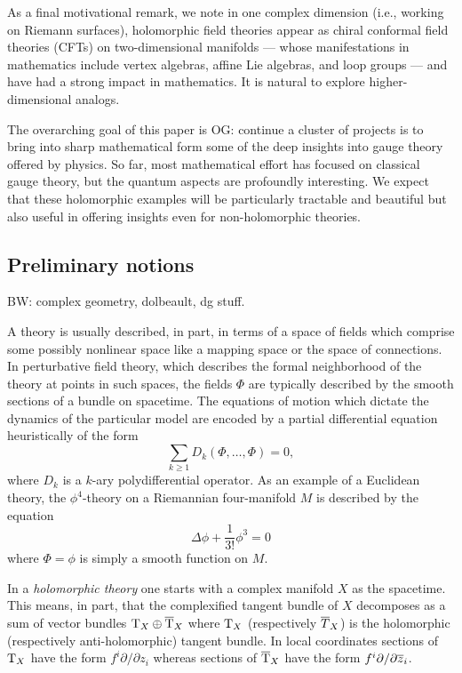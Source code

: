 \documentclass[11pt]{amsart}
\def\del{\partial}
\def\brian#1{{\textcolor{blue!65!red}{BW: {#1}}}}
\def\owen#1{{\textcolor{violet!65!black}{OG: {#1}}}}
\begin{document}
As a final motivational remark, we note in one complex dimension (i.e., working on Riemann surfaces), holomorphic field theories appear as chiral conformal field theories (CFTs) on two-dimensional manifolds --- whose manifestations in mathematics include vertex algebras, affine Lie algebras, and loop groups --- and have had a strong impact in mathematics.
It is natural to explore higher-dimensional analogs.

The overarching goal of this paper is \owen{continue}
a cluster of projects is to bring into sharp mathematical form some of the deep insights into gauge theory offered by physics.
So far, most mathematical effort has focused on classical gauge theory,
but the quantum aspects are profoundly interesting.
We expect that these holomorphic examples will be particularly tractable and beautiful but also useful in offering insights even for non-holomorphic theories.

\subsection{Preliminary notions}


\brian{complex geometry, dolbeault, dg stuff.}

A theory is usually described, in part, in terms of a space of fields which comprise some possibly nonlinear space like a mapping space or the space of connections. 
In perturbative field theory, which describes the formal neighborhood of the theory at points in such spaces, the fields $\Phi$ are typically described by the smooth sections of a bundle on spacetime.
The equations of motion which dictate the dynamics of the particular model are encoded by a partial differential equation heuristically of the form 
\[
\sum_{k \geq 1} D_k(\Phi,\ldots,\Phi) = 0 ,
\]
where $D_k$ is a $k$-ary polydifferential operator.
As an example of a Euclidean theory, the $\phi^4$-theory on a Riemannian four-manifold $M$ is described by the equation
\[
\Delta \phi + \frac{1}{3!} \phi^3 = 0 
\]
where $\Phi = \phi$ is simply a smooth function on $M$.
 
In a {\em holomorphic theory} one starts with a complex manifold $X$ as the spacetime.
This means, in part, that the complexified tangent bundle of $X$ decomposes as a sum of vector bundles $\T_X \oplus \Bar{\T}_X$ where $\T_X$ (respectively $\Bar{T}_X$) is the holomorphic (respectively anti-holomorphic) tangent bundle.
In local coordinates sections of $\T_X$ have the form $f^i \del / \del z_i$ whereas sections of $\Bar{\T}_X$ have the form $f^i \del / \del \zbar_i$. 
\end{document}
